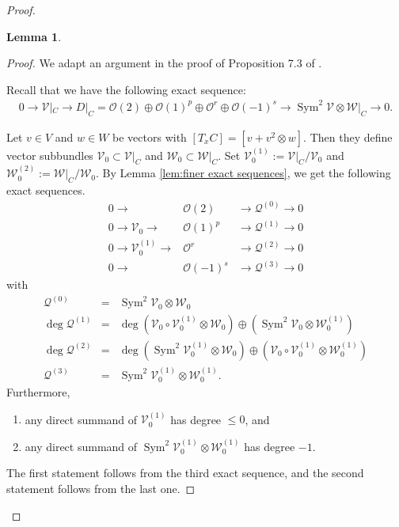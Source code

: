 \documentclass[12pt]{amsart}
\theoremstyle{plain}
\newtheorem{lemma} [theorem]{Lemma}
\theoremstyle{definition}
\def\Sym{\operatorname{Sym}}
\begin{document}
\begin{proof}
\begin{lemma}
\begin{enumerate}
\end{enumerate}

\end{lemma}

\begin{proof}
We adapt an argument in the proof of Proposition 7.3 of \cite{HL21}.

Recall that we have the following exact sequence:
\begin{eqnarray*}
0 \rightarrow \mathcal V|_C \rightarrow D |_C = \mathcal O(2) \oplus \mathcal O(1)^p \oplus \mathcal O^r \oplus \mathcal O(-1)^s \rightarrow \Sym^2 \mathcal V \otimes \mathcal W |_C \rightarrow 0.
\end{eqnarray*}

Let $v \in V$ and $w \in W$ be vectors  with $[T_xC] =[v + v^2 \otimes w]$. Then they define  vector subbundles $\mathcal V_0 \subset \mathcal V|_C$ and $\mathcal W_0 \subset \mathcal W|_C$. Set $\mathcal V_0^{(1)}:=\mathcal V|_C/\mathcal V_0$ and $\mathcal W_0^{(2)}:=\mathcal W|_C/\mathcal W_0$.
By Lemma \ref{lem:finer exact sequences}, we get the following exact sequences.
%
\begin{eqnarray*}
0 \rightarrow &\mathcal O(2)& \rightarrow\mathcal Q^{(0)} \rightarrow 0 \\
0 \rightarrow \mathcal V_0  \rightarrow &\mathcal O(1)^p& \rightarrow \mathcal Q^{(1)}  \rightarrow 0 \\
0 \rightarrow \mathcal V_0^{(1)}  \rightarrow &\mathcal O^r& \rightarrow \mathcal Q^{(2)}  \rightarrow 0\\
0 \rightarrow &\mathcal O(-1)^s& \rightarrow \mathcal Q^{(3)} \rightarrow 0
\end{eqnarray*}
with
\begin{eqnarray*}
  \mathcal Q^{(0)} &= &    \Sym^2 \mathcal V_0 \otimes \mathcal W_0  \\
\deg \mathcal Q^{(1)} &=& \deg \left(\mathcal V_0 \circ \mathcal V_0^{(1)}    \otimes \mathcal W_0\right)  \oplus \left( \Sym^2 \mathcal V_0 \otimes \mathcal W_0^{(1)} \right)  \\
\deg \mathcal Q^{(2)} &=& \deg \left(\Sym^2 \mathcal V_0^{(1)}  \otimes \mathcal W_0\right)  \oplus \left( \mathcal V_0 \circ  \mathcal V_0^{(1)}  \otimes \mathcal W _0^{(1)} \right)  \\
 \mathcal Q^{(3)} &= &     \Sym^2  \mathcal V _0^{(1)}  \otimes  \mathcal W_0^{(1)} .
\end{eqnarray*}
%
Furthermore,
\begin{enumerate}
\item[]
any direct summand of $\mathcal V_0^{(1)}$ has degree $\leq 0$, and
\item[]
any direct summand of $\Sym^2 \mathcal V_0^{(1)} \otimes \mathcal W_0^{(1)}$ has degree  $  -1$.
\end{enumerate}
The first statement follows from the third exact sequence, and the second statement follows from the last one.


\end{proof}
\end{proof}
\end{document}
